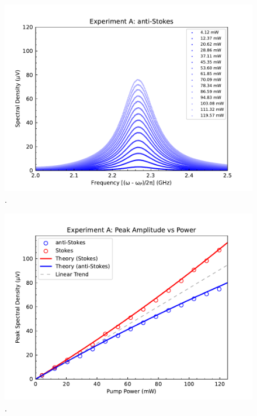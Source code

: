 \begin{figure}[t]
  \centering
  \includegraphics[width=\textwidth]{figs/3-Cooling/P-O anti-Stokes.pdf}
  \caption{.}
  \label{fig:Cooling:P-O anti-Stokes}
\end{figure}

\begin{figure}[t]
  \centering
  \includegraphics[width=\textwidth]{figs/3-Cooling/P-O Heights vs Pow.pdf}
  \caption{.}
  \label{fig:Cooling:P-O Heights vs Pow}
\end{figure}

